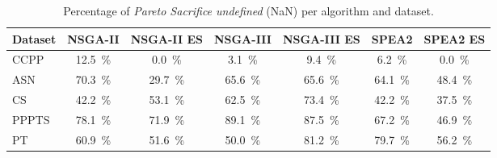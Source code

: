 \begin{table}[ht]
\centering
\caption{Percentage of \textit{Pareto Sacrifice undefined} (NaN) per algorithm and dataset.}
\label{tab:pareto_sacrifice_undefined_nsga-iinsga-ii esnsga-iiinsga-iii esspea2spea2 es}
\begin{tabular}{lcccccc}
\hline
Dataset & NSGA-II & NSGA-II ES & NSGA-III & NSGA-III ES & SPEA2 & SPEA2 ES \\
\hline
CCPP & 12.5~\% & 0.0~\% & 3.1~\% & 9.4~\% & 6.2~\% & 0.0~\% \\
ASN & 70.3~\% & 29.7~\% & 65.6~\% & 65.6~\% & 64.1~\% & 48.4~\% \\
CS & 42.2~\% & 53.1~\% & 62.5~\% & 73.4~\% & 42.2~\% & 37.5~\% \\
PPPTS & 78.1~\% & 71.9~\% & 89.1~\% & 87.5~\% & 67.2~\% & 46.9~\% \\
PT & 60.9~\% & 51.6~\% & 50.0~\% & 81.2~\% & 79.7~\% & 56.2~\% \\
\hline
\end{tabular}
\end{table}